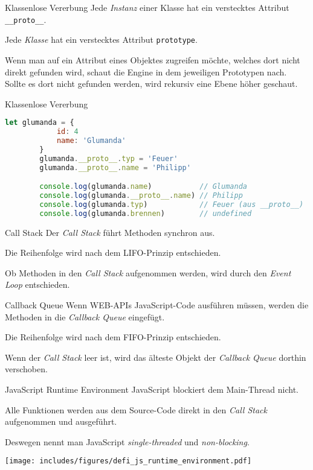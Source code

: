 \begin{bonus}{Klassenlose Vererbung}
    Jede \emph{Instanz} einer Klasse hat ein verstecktes Attribut \texttt{\_\_proto\_\_}.

    Jede \emph{Klasse} hat ein verstecktes Attribut \texttt{prototype}.

    Wenn man auf ein Attribut eines Objektes zugreifen möchte, welches dort nicht direkt gefunden wird, schaut die Engine in dem jeweiligen Prototypen nach.
    Sollte es dort nicht gefunden werden, wird rekursiv eine Ebene höher geschaut.
\end{bonus}

\begin{example}{Klassenlose Vererbung}
    \begin{lstlisting}[language=JavaScript]
        let glumanda = {
            id: 4
            name: 'Glumanda'
        }
        glumanda.__proto__.typ = 'Feuer'
        glumanda.__proto__.name = 'Philipp'

        console.log(glumanda.name)           // Glumanda
        console.log(glumanda.__proto__.name) // Philipp
        console.log(glumanda.typ)            // Feuer (aus __proto__)
        console.log(glumanda.brennen)        // undefined
    \end{lstlisting}
\end{example}

\begin{defi}{Call Stack}
    Der \emph{Call Stack} führt Methoden synchron aus.

    Die Reihenfolge wird nach dem LIFO-Prinzip entschieden.

    Ob Methoden in den \emph{Call Stack} aufgenommen werden, wird durch den \emph{Event Loop} entschieden.
\end{defi}

\begin{defi}{Callback Queue}
    Wenn WEB-APIs JavaScript-Code ausführen müssen, werden die Methoden in die \emph{Callback Queue} eingefügt.

    Die Reihenfolge wird nach dem FIFO-Prinzip entschieden.

    Wenn der \emph{Call Stack} leer ist, wird das älteste Objekt der \emph{Callback Queue} dorthin verschoben.
\end{defi}

\begin{defi}{JavaScript Runtime Environment}
    JavaScript blockiert dem Main-Thread nicht.

    Alle Funktionen werden aus dem Source-Code direkt in den \emph{Call Stack} aufgenommen und ausgeführt.

    Deswegen nennt man JavaScript \emph{single-threaded} und \emph{non-blocking}.

    \begin{center}
        \texttt{[image: includes/figures/defi\_js\_runtime\_environment.pdf]}
    \end{center}
\end{defi}

